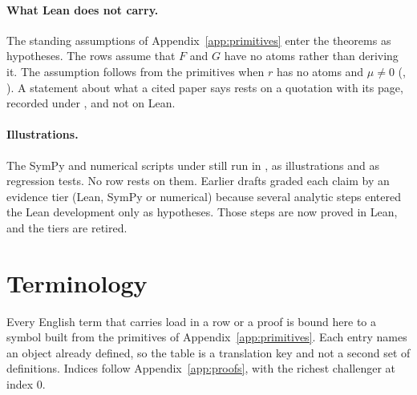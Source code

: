 \paragraph{What Lean does not carry.} The standing assumptions of
Appendix~\ref{app:primitives} enter the theorems as hypotheses. The rows assume
that $F$ and $G$ have no atoms rather than deriving it. The assumption follows
from the primitives when $r$ has no atoms and $\mu\ne0$
(,
). A statement about what a
cited paper says rests on a quotation with its page, recorded under
, and not on Lean.

\paragraph{Illustrations.} The SymPy and numerical scripts under
 still run in , as illustrations and as
regression tests. No row rests on them. Earlier drafts graded each claim by an
evidence tier (Lean, SymPy or numerical) because several analytic steps entered
the Lean development only as hypotheses. Those steps are now proved in Lean,
and the tiers are retired.

\section{Terminology}
\label{app:terminology}

Every English term that carries load in a row or a proof is bound here to a
symbol built from the primitives of Appendix~\ref{app:primitives}. Each entry
names an object already defined, so the table is a translation key and not a
second set of definitions. Indices follow Appendix~\ref{app:proofs}, with the
richest challenger at index $0$.

